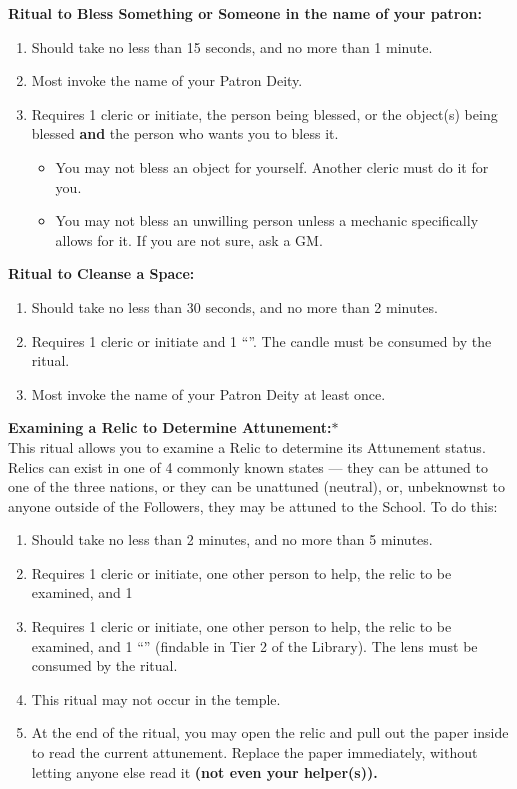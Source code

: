 \documentclass[green]{GL2020}
\begin{document}
\textbf{Ritual to Bless Something or Someone in the name of your patron:}
  \begin{enumerate}
    \item Should take no less than 15 seconds, and no more than 1 minute.
    \item Most invoke the name of your Patron Deity.
    \item Requires 1 cleric or initiate, the person being blessed, or the object(s) being blessed \textbf{and} the person who wants you to bless it. 
    \begin{itemize}
      \item You may not bless an object for yourself. Another cleric must do it for you.
      \item You may not bless an unwilling person unless a mechanic specifically allows for it. If you are not sure, ask a GM.
    \end{itemize}
  \end{enumerate}

\textbf{Ritual to Cleanse a Space:}
  \begin{enumerate}
    \item Should take no less than 30 seconds, and no more than 2 minutes.
    \item Requires 1 cleric or initiate and 1 ``\iRitualCandle{}''. The candle must be consumed by the ritual.
    \item Most invoke the name of your Patron Deity at least once.
  \end{enumerate}
   
\textbf{Examining a Relic to Determine Attunement:}$*$\\
This ritual allows you to examine a Relic to determine its Attunement status. Relics can exist in one of 4 commonly known states — they can be attuned to one of the three nations, or they can be unattuned (neutral), or, unbeknownst to anyone outside of the Followers, they may be attuned to the School. To do this:
  \begin{enumerate}
    \item Should take no less than 2 minutes, and no more than 5 minutes.
    \item Requires 1 cleric or initiate, one other person to help, the relic to be examined, and 1     \item Requires 1 cleric or initiate, one other person to help, the relic to be examined, and 1 ``\iCrystalLens{}'' (findable in Tier 2 of the Library). The lens must be consumed by the ritual. 
    \item This ritual may not occur in the temple.
    \item At the end of the ritual, you may open the relic and pull out the paper inside to read the current attunement. Replace the paper immediately, without letting anyone else read it \textbf{(not even your helper(s)).}
  \end{enumerate}
   
\end{document}
